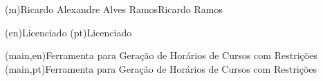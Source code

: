 
%



\ncauthorname(m){Ricardo Alexandre Alves Ramos}{Ricardo Ramos}


\ncauthordegree(en){Licenciado} 
\ncauthordegree(pt){Licenciado}




\nctitle(main,en){Ferramenta para Geração de Horários de Cursos com Restrições}%
\nctitle(main,pt){Ferramenta para Geração de Horários de Cursos com Restrições}%

